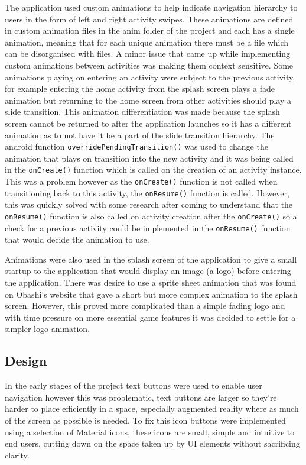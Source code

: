 \documentclass{l3proj}
\begin{document}
The application used custom animations to help indicate navigation hierarchy to users in the form of left and right activity swipes. These animations are defined in custom animation files in the anim folder of the project and each has a single animation, meaning that for each unique animation there must be a file which can be disorganised with files. A minor issue that came up while implementing custom animations between activities was making them context sensitive. Some animations playing on entering an activity were subject to the previous activity, for example entering the home activity from the splash screen plays a fade animation but returning to the home screen from other activities should play a slide transition. This animation differentiation was made because the splash screen cannot be returned to after the application launches so it has a different animation as to not have it be a part of the slide transition hierarchy. The android function \verb|overridePendingTransition()|\cite{overridePendingTransition} was used to change the animation that plays on transition into the new activity and it was being called in the \verb|onCreate()|\cite{onCreate} function which is called on the creation of an activity instance. This was a problem however as the  \verb|onCreate()| function is not called when transitioning back to this activity, the  \verb|onResume()|\cite{onResume} function is called. However, this was quickly solved with some research after coming to understand that the \verb|onResume()| function is also called on activity creation after the  \verb|onCreate()| so a check for a previous activity could be implemented in the \verb|onResume()| function that would decide the animation to use. 

Animations were also used in the splash screen of the application to give a small startup to the application that would display an image (a logo) before entering the application. There was desire to use a sprite sheet animation that was found on Obashi’s website that gave a short but more complex animation to the splash screen. However, this proved more complicated than a simple fading logo and with time pressure on more essential game features it was decided to settle for a simpler logo animation. 

\subsection{Design}

In the early stages of the project text buttons were used to enable user navigation however this was problematic, text buttons are larger so they’re harder to place efficiently in a space, especially augmented reality where as much of the screen as possible is needed. To fix this icon buttons were implemented using a selection of Material icons\cite{Material}, these icons are small, simple and intuitive to end users, cutting down on the space taken up by UI elements without sacrificing clarity. 
\end{document}
